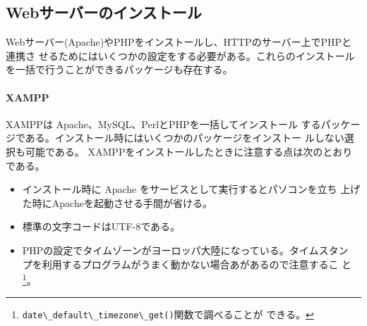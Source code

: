 \subsection{Webサーバーのインストール}
Webサーバー(Apache)やPHPをインストールし、HTTPのサーバー上でPHPと連携さ
せるためにはいくつかの設定をする必要がある。これらのインストール
を一括で行うことができるパッケージも存在する。
\paragraph{XAMPP}XAMPPは Apache、MySQL、PerlとPHPを一括してインストール
するパッケージである。インストール時にはいくつかのパッケージをインストー
ルしない選択も可能である。%
XAMPPをインストールしたときに注意する点は次のとおりである。
\begin{itemize}
 \item インストール時に Apache をサービスとして実行するとパソコンを立ち
       上げた時にApacheを起動させる手間が省ける。
 \item 標準の文字コードは{UTF-8}である。
 \item PHPの設定でタイムゾーンがヨーロッパ大陸になっている。タイムスタン
       プを利用するプログラムがうまく動かない場合あがあるので注意するこ
       と\footnote{\Verb+date\_default\_timezone\_get()+関数で調べることが
       できる。}。
\end{itemize}



